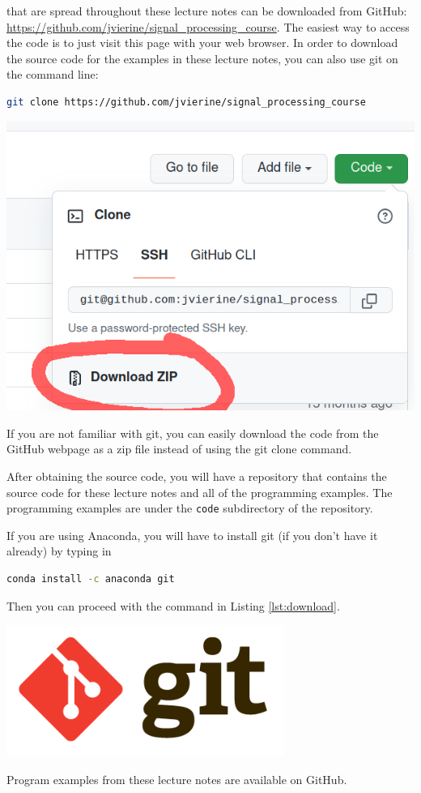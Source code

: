  that are spread throughout these lecture
notes can be downloaded from GitHub:
\url{https://github.com/jvierine/signal_processing_course}. The easiest
way to access the code is to just visit this page with your web
browser. In order to download the source code for the examples in
these lecture notes, you can also use git on the command line:
\begin{lstlisting}[language=sh,caption=Obtaining the source code for the programming examples with git,label=lst:download]
git clone https://github.com/jvierine/signal_processing_course
\end{lstlisting}
\begin{marginfigure}
  \includegraphics[width=\textwidth]{ch02/figures/downloadgit.png}
  \caption{If you are not familiar with git, you can easily download the code from the GitHub webpage as a zip file instead of using the git clone command.}
\end{marginfigure}
After obtaining the source code, you will have a repository that contains the source code for these lecture notes and all of the programming examples. The programming examples are under the \verb|code| subdirectory of the repository.

If you are using Anaconda, you will have to install git (if you don't
have it already) by typing in
\begin{lstlisting}[language=sh,caption=Obtaining the source code for the programming examples with git,label=lst:downloadgit]
  conda install -c anaconda git
\end{lstlisting}
Then you can proceed with the command in Listing \ref{lst:download}.

\begin{marginfigure}
  \includegraphics[width=0.68\textwidth]{ch02/figures/gitlogo.png}
  \caption{Program examples from these lecture notes are available on GitHub.}
\end{marginfigure}
